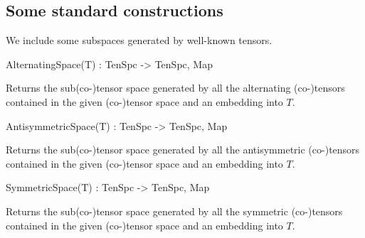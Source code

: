 \subsection{Some standard constructions}

We include some subspaces generated by well-known tensors.

\begin{intrinsics}
AlternatingSpace(T) : TenSpc -> TenSpc, Map
\end{intrinsics}

Returns the sub(co-)tensor space generated by all the alternating (co-)tensors
contained in the given (co-)tensor space and an embedding into $T$.

\begin{intrinsics}
AntisymmetricSpace(T) : TenSpc -> TenSpc, Map
\end{intrinsics}

Returns the sub(co-)tensor space generated by all the antisymmetric (co-)tensors
contained in the given (co-)tensor space and an embedding into $T$.

\begin{intrinsics}
SymmetricSpace(T) : TenSpc -> TenSpc, Map
\end{intrinsics}

Returns the sub(co-)tensor space generated by all the symmetric (co-)tensors
contained in the given (co-)tensor space  and an embedding into $T$.

